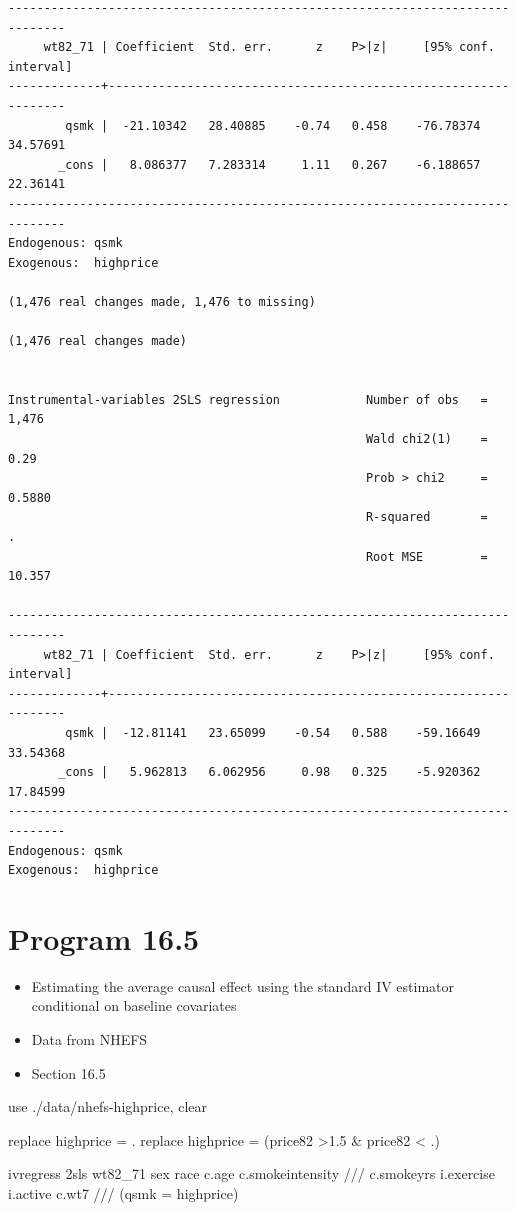 \documentclass[
  10pt,
  a4paper,
]{book}
\newenvironment{Shaded}{\begin{snugshade}}{\end{snugshade}}
\newcommand{\CommentTok}[1]{\textcolor[rgb]{0.37,0.37,0.37}{#1}}
\newcommand{\KeywordTok}[1]{\textcolor[rgb]{0.00,0.46,0.62}{#1}}
\newcommand{\NormalTok}[1]{\textcolor[rgb]{0.00,0.46,0.62}{#1}}
\providecommand{\tightlist}{%
  \setlength{\itemsep}{0pt}\setlength{\parskip}{0pt}}
\begin{document}
\begin{verbatim}
------------------------------------------------------------------------------
     wt82_71 | Coefficient  Std. err.      z    P>|z|     [95% conf. interval]
-------------+----------------------------------------------------------------
        qsmk |  -21.10342   28.40885    -0.74   0.458    -76.78374    34.57691
       _cons |   8.086377   7.283314     1.11   0.267    -6.188657    22.36141
------------------------------------------------------------------------------
Endogenous: qsmk
Exogenous:  highprice

(1,476 real changes made, 1,476 to missing)

(1,476 real changes made)


Instrumental-variables 2SLS regression            Number of obs   =      1,476
                                                  Wald chi2(1)    =       0.29
                                                  Prob > chi2     =     0.5880
                                                  R-squared       =          .
                                                  Root MSE        =     10.357

------------------------------------------------------------------------------
     wt82_71 | Coefficient  Std. err.      z    P>|z|     [95% conf. interval]
-------------+----------------------------------------------------------------
        qsmk |  -12.81141   23.65099    -0.54   0.588    -59.16649    33.54368
       _cons |   5.962813   6.062956     0.98   0.325    -5.920362    17.84599
------------------------------------------------------------------------------
Endogenous: qsmk
Exogenous:  highprice
\end{verbatim}

\section{Program 16.5}\label{program-16.5-1}

\begin{itemize}
\tightlist
\item
  Estimating the average causal effect using the standard IV estimator conditional on baseline covariates
\item
  Data from NHEFS
\item
  Section 16.5
\end{itemize}

\begin{Shaded}
\begin{Highlighting}[]
\KeywordTok{use}\NormalTok{ ./}\KeywordTok{data}\NormalTok{/nhefs{-}highprice, }\KeywordTok{clear}

\KeywordTok{replace}\NormalTok{ highprice = .}
\KeywordTok{replace}\NormalTok{ highprice = (price82 \textgreater{}1.5 \& price82 \textless{} .)}

\NormalTok{ivregress 2sls wt82\_71 sex race c.age c.smokeintensity }\CommentTok{///}
\NormalTok{  c.smokeyrs i.exercise i.active c.wt7 }\CommentTok{///}
\NormalTok{  (qsmk = highprice)}
\end{Highlighting}
\end{Shaded}
\end{document}
